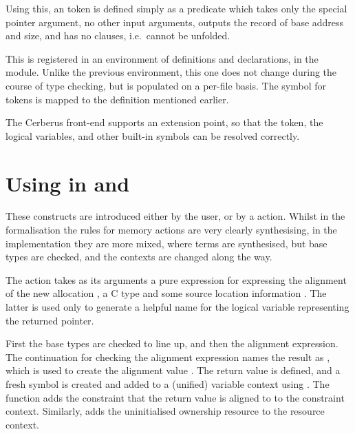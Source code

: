 
Using this, an  token is defined simply as a predicate which
takes only the special pointer argument, no other input arguments, outputs the
record of base address and size, and has no clauses, i.e.\ cannot be unfolded.


This is registered in an environment of definitions and declarations, in the
 module. Unlike the previous environment, this one does not
change during the course of type checking, but is populated on a per-file
basis. The symbol for  tokens is mapped to the definition
mentioned earlier.


The Cerberus front-end supports an extension point, so that the
 token, the  logical variables, and other
built-in symbols can be resolved correctly.

\section{Using  in  and }

These constructs are introduced either by the user, or by a 
action. Whilst in the formalisation the rules for memory actions are very
clearly synthesising, in the implementation they are more mixed, where terms
are synthesised, but base types are checked, and the contexts are changed along
the way.

The  action takes as its arguments a pure expression for expressing
the alignment of the new allocation , a C type  and some
source location information . The latter is used only to generate
a helpful name for the logical variable representing the returned pointer.

First the base types are checked to line up, and then the alignment expression.
The continuation for checking the alignment expression names the result as
, which is used to create the alignment value
. The return value  is defined, and a
fresh symbol is created  and added to a (unified) variable
context using . The function  adds the
constraint that the return value  is aligned to
 to the constraint context. Similarly, 
adds the uninitialised ownership resource to the resource context.

